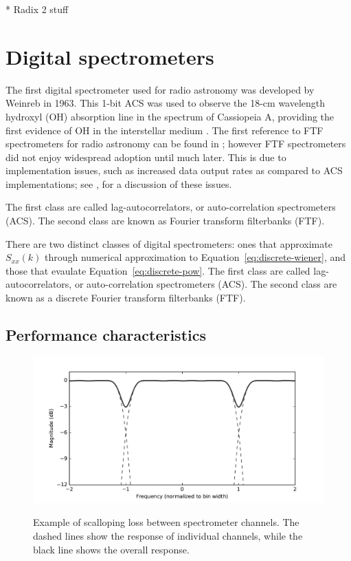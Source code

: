 \documentclass{ws-rv961x669}
\begin{document}
* Radix 2 stuff

\section{Digital spectrometers}

The first digital spectrometer used for radio astronomy was developed by Weinreb\citet{Weinreb:1963p10042} in 1963. This 1-bit ACS was used to observe the 18-cm wavelength hydroxyl (OH) absorption line in the spectrum of Cassiopeia A, providing the first evidence of OH in the interstellar medium \citep{Weinreb:1963p9992}. The first reference to FTF spectrometers for radio astronomy can be found in \citet{Chikada:1987p10044}; however FTF spectrometers did not enjoy widespread adoption until much later. This is due to implementation issues, such as increased data output rates as compared to ACS implementations; see \citet{Bunton2000}, for a discussion of these issues.

The first class are called lag-autocorrelators, or auto-correlation spectrometers (ACS). The second class are known as Fourier transform filterbanks (FTF).

There are two distinct classes of digital spectrometers: ones that approximate $S_{xx}(k)$ through numerical approximation to Equation~\ref{eq:discrete-wiener}, and those that evaulate Equation~\ref{eq:discrete-pow}. The first class are called lag-autocorrelators, or auto-correlation spectrometers (ACS). The second class are known as a discrete Fourier transform filterbanks (FTF).  


\subsection{Performance characteristics}

\begin{figure}
 \centering
 \includegraphics[width=\textwidth]{./figures/pfb_scalloping}
 \label{fig:scalloping}
 \caption{Example of scalloping loss between spectrometer channels. The dashed lines show the response of individual channels, while the black line shows the overall response.}
\end{figure}
\end{document}
